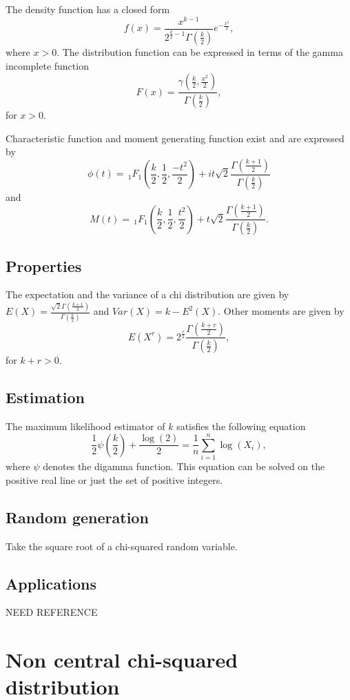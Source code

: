 The density function has a closed form
$$
f(x) = \frac{x^{k-1}}{2^{\frac{k}{2}-1}\Gamma\left(\frac{k}{2}\right)} e^{-\frac{x^2}{2}},
$$
where $x>0$.
The distribution function can be expressed in terms of the gamma incomplete function
$$
F(x) = \frac{\gamma(\frac{k}{2}, \frac{x^2}{2})}{\Gamma\left(\frac{k}{2}\right)},
$$
for $x>0$. 

Characteristic function and moment generating function exist and are expressed by
$$
\phi(t) = {\,}_1F_1\left(\frac{k}{2},\frac{1}{2},\frac{-t^2}{2}\right)+it\sqrt{2}\frac{\Gamma\left(\frac{k+1}{2}\right)}{\Gamma\left(\frac{k}{2}\right)} 
$$
and
$$
M(t) = {\,}_1F_1\left(\frac{k}{2},\frac{1}{2},\frac{t^2}{2}\right) +t\sqrt{2}\frac{\Gamma\left(\frac{k+1}{2}\right)}{\Gamma\left(\frac{k}{2}\right)}.
$$


\subsection{Properties}
The expectation and the variance of a chi distribution are given by $E(X) =\frac{\sqrt{2} \Gamma(\frac{k+1}{2})}{ \Gamma(\frac{k}{2})} $ and $Var(X) = k-E^2(X)$. Other moments are given by
$$
E(X^r) = 2^{\frac{r}{2}}\frac{ \Gamma(\frac{k+r}{2})}{ \Gamma(\frac{k}{2})},
$$
for $k+r>0$.

\subsection{Estimation}
The maximum likelihood estimator of $k$ satisfies the following equation
$$
\frac{1}{2}\psi\left(\frac{k}{2}\right)+ \frac{\log(2)}{2} = \frac{1}{n}\sum_{i=1}^n\log(X_i),
$$
where $\psi$ denotes the digamma function. This equation can be solved on the positive real line or just the set of positive integers.

\subsection{Random generation}
Take the square root of a chi-squared random variable.

\subsection{Applications}
NEED REFERENCE

\section{Non central chi-squared distribution}

